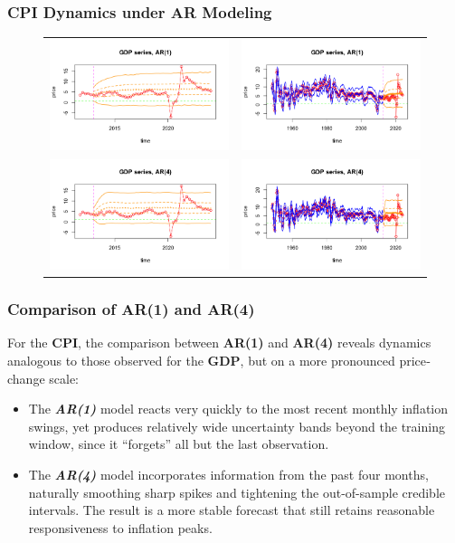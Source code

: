 \documentclass{Configuration_Files/PoliMi3i_thesis}
\begin{document}
\subsubsection{CPI Dynamics under AR Modeling}
\begin{figure}[H]
  \centering
  \begin{tabular}{@{}cc@{}}
    \includegraphics[angle=270,width=0.335\linewidth]{zAR(1).png} &
    \includegraphics[angle=270,width=0.33\linewidth]{fAR(1).png} \\
    \includegraphics[angle=270,width=0.33\linewidth]{zAR(4).png} &
    \includegraphics[angle=270,width=0.33\linewidth]{fAR(4).png}
  \end{tabular}
\end{figure}


\subsubsection*{Comparison of AR(1) and AR(4)}
For the \textbf{CPI}, the comparison between \textbf{AR(1)} and \textbf{AR(4)} reveals dynamics analogous to those observed for the \textbf{GDP}, but on a more pronounced price‐change scale:
\begin{itemize}
    \item The \textbf{\textit{AR(1)}} model reacts very quickly to the most recent monthly inflation swings, yet produces relatively wide uncertainty bands beyond the training window, since it “forgets” all but the last observation.
	\item The \textbf{\textit{AR(4)}} model incorporates information from the past four months, naturally smoothing sharp spikes and tightening the out-of-sample credible intervals. The result is a more stable forecast that still retains reasonable responsiveness to inflation peaks.
\end{itemize}
\end{document}
